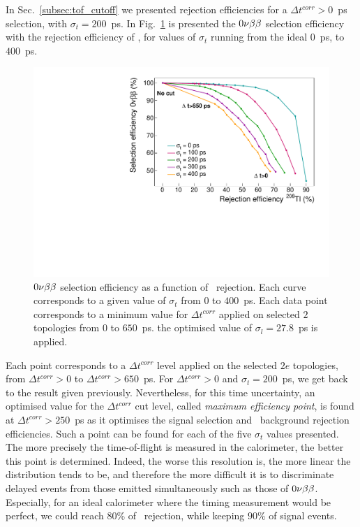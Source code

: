 In Sec.~\ref{subsec:tof_cutoff} we presented rejection efficiencies for a ${\Delta t^{corr}>0}$~ps selection, with ${\sigma_{t}=200}$~ps.
In Fig.~\ref{fig:eff_cut_delta_t_sigma} is presented the $0\nu\beta\beta$ selection efficiency with the rejection efficiency of \Tl, for values of $\sigma_{t}$ running from the ideal $0$~ps, to $400$~ps.
\begin{figure}[!h]
  \centering
  \includegraphics[width=13cm]{timedifference/fig_timediff/compare_sigma_cut_delta_t.pdf}
  \caption{$0\nu\beta\beta$ selection efficiency as a function of \Tl\ rejection.
    Each curve corresponds to a given value of $\sigma_{t}$ from $0$ to $400$~ps.
    Each data point corresponds to a minimum value for $\Delta t^{corr}$ applied on selected $2$ topologies from $0$ to $650$~ps.
    the optimised value of $\sigma_{l}=27.8$~ps is applied.
    \label{fig:eff_cut_delta_t_sigma}}
\end{figure}
Each point corresponds to a $\Delta t^{corr}$ level applied on the selected $2e$ topologies, from ${\Delta t^{corr}>0}$ to ${\Delta t^{corr}>650}$~ps.
For ${\Delta t^{corr}>0}$ and $\sigma_{t}=200$~ps, we get back to the result given previously.
Nevertheless, for this time uncertainty, an optimised value for the $\Delta t^{corr}$ cut level, called \emph{maximum efficiency point}, is found at ${\Delta t^{corr}>250}$~ps as it optimises the signal selection and \Tl\ background rejection efficiencies.
Such a point can be found for each of the five $\sigma_{t}$ values presented.
The more precisely the time-of-flight is measured in the calorimeter, the better this point is determined.
Indeed, the worse this resolution is, the more linear the distribution tends to be, and therefore the more difficult it is to discriminate delayed events from those emitted simultaneously such as those of $0\nu\beta\beta$.
Especially, for an ideal calorimeter where the timing measurement would be perfect, we could reach $80$\% of \Tl\ rejection, while keeping $90$\% of signal events.

